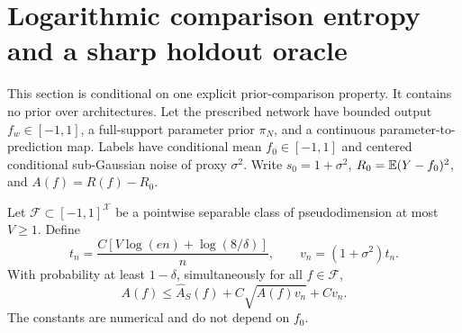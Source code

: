 \section{Logarithmic comparison entropy and a sharp holdout oracle}
\label{sec:log-comparison-statistics}
This section is conditional on one explicit prior-comparison property. It contains no prior over architectures. Let the prescribed network have bounded output $f_w\in[-1,1]$, a full-support parameter prior $\pi_N$, and a continuous parameter-to-prediction map. Labels have conditional mean $f_0\in[-1,1]$ and centered conditional sub-Gaussian noise of proxy $\sigma^2$. Write $s_0=1+\sigma^2$, $R_0=\mathbb E(Y-f_0)^2$, and $A(f)=R(f)-R_0$.

\begin{lemma}
\label{lem:subgaussian-VC-excess}
Let $\mathcal F\subset[-1,1]^{\mathcal X}$ be a pointwise separable class of pseudodimension at most $V\ge1$. Define
\[
 t_n=\frac{C[V\log(en)+\log(8/\delta)]}{n},
 \qquad v_n=(1+\sigma^2)t_n.
\]
With probability at least $1-\delta$, simultaneously for all $f\in\mathcal F$,
\[
 A(f)\le\widehat A_S(f)+C\sqrt{A(f)v_n}+Cv_n.
\]
The constants are numerical and do not depend on $f_0$.
\end{lemma}
